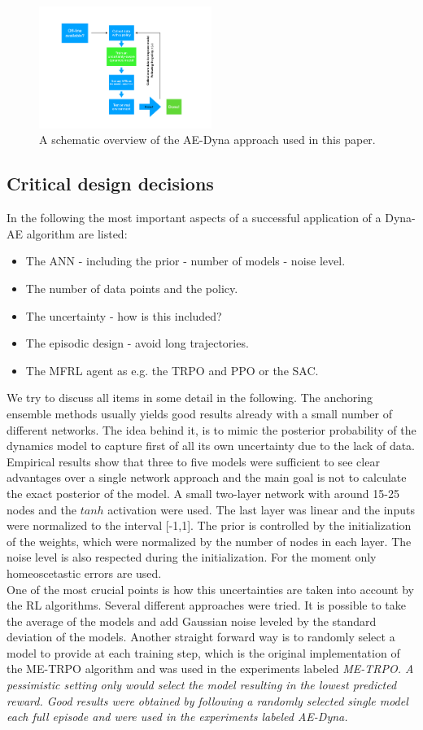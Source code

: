 \documentclass[
 reprint,
 amsmath,amssymb,amsfonts,clevref,
 aps,
prstab,
]{revtex4-2}
\begin{document}
\begin{figure}[!h]
	\centering
	\includegraphics*[width=0.5\textwidth]{Figures/MBRL_overview}
	\caption{A schematic overview of the AE-Dyna approach used in this paper.}
	\label{fig:MBRL_overview}
\end{figure}
\subsection{Critical design decisions}
In the following the most important aspects of a successful application of a Dyna-AE algorithm are listed:
\begin{itemize}
	\item The ANN - including the prior - number of models - noise level.
	\item The number of data points and the policy.
	\item The uncertainty - how is this included?
	\item The episodic design - avoid long trajectories.
	\item The MFRL agent as e.g. the TRPO and PPO or the SAC.
\end{itemize}
We try to discuss all items in some detail in the following.
The anchoring ensemble methods usually yields good results already with a small number of different networks. The idea behind it, is to mimic the posterior probability of the dynamics model to capture first of all its own uncertainty due to the lack of data. Empirical results show that three to five models were sufficient to see clear advantages over a single network approach and the main goal is not to calculate the exact posterior of the model. A small two-layer network with around 15-25 nodes and the $tanh$ activation were used. The last layer was linear and the inputs were normalized to the interval [-1,1]. The prior is controlled by the initialization of the weights, which were normalized by the number of nodes in each layer. The noise level is also respected during the initialization. For the moment only homeoscetastic errors are used.\\
One of the most crucial points is how this uncertainties are taken into account by the RL algorithms. Several different approaches were tried. It is possible to take the average of the models and add Gaussian noise leveled by the standard deviation of the models. Another straight forward way is to randomly select a model to provide at each training step, which is the original implementation of the ME-TRPO algorithm and was used in the experiments labeled \it{ME-TRPO}. A pessimistic setting only would select the model resulting in the lowest predicted reward. Good results were obtained by following a randomly selected single model each full episode and were used in the experiments labeled \it{AE-Dyna}.
\end{document}
